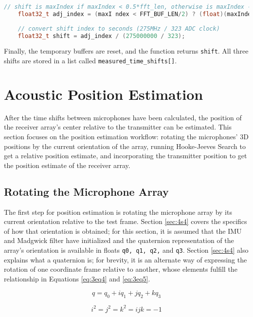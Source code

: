 \documentclass[11pt]{ucthesisCP}
\begin{document}
\begin{lstlisting}[language=C++]
	// shift is maxIndex if maxIndex < 0.5*fft_len, otherwise is maxIndex - fft_len
	float32_t adj_index = (maxI ndex < FFT_BUF_LEN/2) ? (float)(maxIndex) : (float)(-FFT_BUF_LEN + maxIndex);
	
	// convert shift index to seconds (275MHz / 323 ADC clock)
	float32_t shift = adj_index / (275000000 / 323);
\end{lstlisting}

Finally, the temporary buffers are reset, and the function returns \verb|shift|. All three shifts are stored in a list called \verb|measured_time_shifts[]|.

\section{Acoustic Position Estimation} \label{sec:3s9}
After the time shifts between microphones have been calculated, the position of the receiver array’s center relative to the transmitter can be estimated. This section focuses on the position estimation workflow: rotating the microphones’ 3D positions by the current orientation of the array, running Hooke-Jeeves Search to get a relative position estimate, and incorporating the transmitter position to get the position estimate of the receiver array.

\subsection{Rotating the Microphone Array} \label{ssec:3s9s1}
The first step for position estimation is rotating the microphone array by its current orientation relative to the test frame. Section \ref{sec:4s4} covers the specifics of how that orientation is obtained; for this section, it is assumed that the IMU and Madgwick filter have initialized and the quaternion representation of the array’s orientation is available in floats \verb|q0, q1, q2,| and \verb|q3|. Section \ref{sec:4s4} also explains what a quaternion is; for brevity, it is an alternate way of expressing the rotation of one coordinate frame relative to another, whose elements fulfill the relationship in Equations \ref{eq:3eq4} and \ref{eq:3eq5}.

\begin{equation} \label{eq:3eq4}
	q = q_0 + iq_1 + jq_2 + kq_3
\end{equation}

\begin{equation} \label{eq:3eq5}
	i^2 = j^2 = k^2 = ijk = -1
\end{equation}
\end{document}
